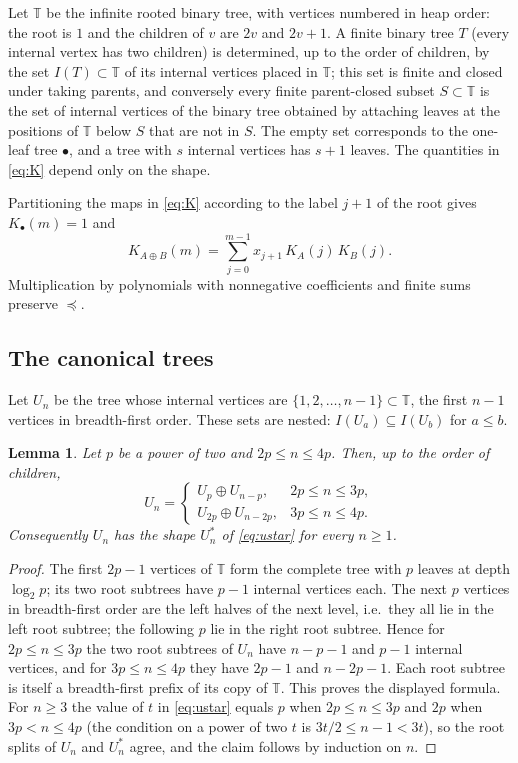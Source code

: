 \documentclass[11pt]{amsart}
\newtheorem{lemma}[theorem]{Lemma}
\theoremstyle{definition}
\theoremstyle{remark}
\newcommand{\pre}{\preceq}
\newcommand{\lf}{\bullet}
\newcommand{\T}{\mathbb{T}}
\begin{document}
Let $\T$ be the infinite rooted binary tree, with vertices numbered in heap order: the root is $1$ and the children of $v$ are $2v$ and $2v+1$.
A finite binary tree $T$ (every internal vertex has two children) is determined, up to the order of children, by the set $I(T)\subset\T$ of its internal vertices placed in $\T$; this set is finite and closed under taking parents, and conversely every finite parent-closed subset $S\subset\T$ is the set of internal vertices of the binary tree obtained by attaching leaves at the positions of $\T$ below $S$ that are not in $S$.
The empty set corresponds to the one-leaf tree $\lf$, and a tree with $s$ internal vertices has $s+1$ leaves.
The quantities in \eqref{eq:K} depend only on the shape.

Partitioning the maps in \eqref{eq:K} according to the label $j+1$ of the root gives $K_\lf(m)=1$ and
\begin{equation}\label{eq:rec}
K_{A\oplus B}(m)=\sum_{j=0}^{m-1}x_{j+1}\,K_A(j)\,K_B(j).
\end{equation}
Multiplication by polynomials with nonnegative coefficients and finite sums preserve $\pre$.

\subsection*{The canonical trees}
Let $U_n$ be the tree whose internal vertices are $\{1,2,\dots,n-1\}\subset\T$, the first $n-1$ vertices in breadth-first order.
These sets are nested: $I(U_a)\subseteq I(U_b)$ for $a\le b$.

\begin{lemma}\label{lem:canonical}
Let $p$ be a power of two and $2p\le n\le 4p$.
Then, up to the order of children,
\[
U_n=\begin{cases}U_p\oplus U_{n-p}, & 2p\le n\le 3p,\\ U_{2p}\oplus U_{n-2p}, & 3p\le n\le 4p.\end{cases}
\]
Consequently $U_n$ has the shape $U^*_n$ of \eqref{eq:ustar} for every $n\ge1$.
\end{lemma}

\begin{proof}
The first $2p-1$ vertices of $\T$ form the complete tree with $p$ leaves at depth $\log_2 p$; its two root subtrees have $p-1$ internal vertices each.
The next $p$ vertices in breadth-first order are the left halves of the next level, i.e.\ they all lie in the left root subtree; the following $p$ lie in the right root subtree.
Hence for $2p\le n\le 3p$ the two root subtrees of $U_n$ have $n-p-1$ and $p-1$ internal vertices, and for $3p\le n\le 4p$ they have $2p-1$ and $n-2p-1$.
Each root subtree is itself a breadth-first prefix of its copy of $\T$.
This proves the displayed formula.
For $n\ge 3$ the value of $t$ in \eqref{eq:ustar} equals $p$ when $2p\le n\le 3p$ and $2p$ when $3p<n\le 4p$ (the condition on a power of two $t$ is $3t/2\le n-1<3t$), so the root splits of $U_n$ and $U^*_n$ agree, and the claim follows by induction on $n$.
\end{proof}
\end{document}
